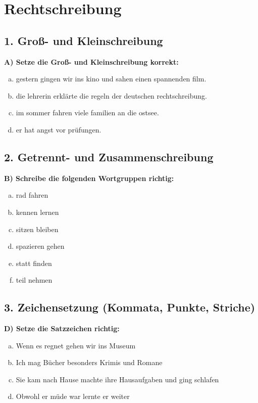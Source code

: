 
\section*{Rechtschreibung}

\subsection*{1. Groß- und Kleinschreibung}
\textbf{A) Setze die Groß- und Kleinschreibung korrekt:}
\begin{enumerate}[a)]
    \item gestern gingen wir ins kino und sahen einen spannenden film.
    \item die lehrerin erklärte die regeln der deutschen rechtschreibung.
    \item im sommer fahren viele familien an die ostsee.
    \item er hat angst vor prüfungen.
\end{enumerate}

\subsection*{2. Getrennt- und Zusammenschreibung}
\textbf{B) Schreibe die folgenden Wortgruppen richtig:}
\begin{enumerate}[a)]
    \item rad fahren
    \item kennen lernen
    \item sitzen bleiben
    \item spazieren gehen
    \item statt finden
    \item teil nehmen
\end{enumerate}

\subsection*{3. Zeichensetzung (Kommata, Punkte, Striche)}
\textbf{D) Setze die Satzzeichen richtig:}
\begin{enumerate}[a)]
    \item Wenn es regnet gehen wir ins Museum
    \item Ich mag Bücher besonders Krimis und Romane
    \item Sie kam nach Hause machte ihre Hausaufgaben und ging schlafen
    \item Obwohl er müde war lernte er weiter
\end{enumerate}

